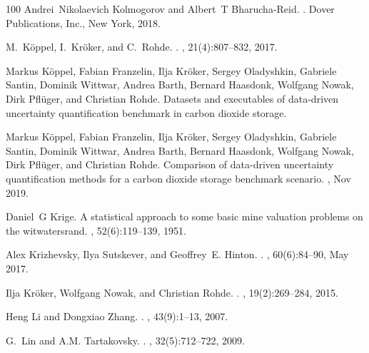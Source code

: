 \documentclass[a4paper,fleqn]{article}
\begin{document}
\begin{thebibliography}{100}
Andrei~Nikolaevich Kolmogorov and Albert~T Bharucha-Reid.
.
\newblock Dover Publications, Inc., New York, 2018.

M.~K{\"o}ppel, I.~Kr{\"o}ker, and C.~Rohde.
.
, 21(4):807--832, 2017.

Markus K{\"o}ppel, Fabian Franzelin, Ilja Kr{\"o}ker, Sergey Oladyshkin,
  Gabriele Santin, Dominik Wittwar, Andrea Barth, Bernard Haasdonk, Wolfgang
  Nowak, Dirk Pfl{\"u}ger, and Christian Rohde.
\newblock Datasets and executables of data-driven uncertainty quantification
  benchmark in carbon dioxide storage.

Markus K{\"o}ppel, Fabian Franzelin, Ilja Kr{\"o}ker, Sergey Oladyshkin,
  Gabriele Santin, Dominik Wittwar, Andrea Barth, Bernard Haasdonk, Wolfgang
  Nowak, Dirk Pfl{\"u}ger, and Christian Rohde.
\newblock Comparison of data-driven uncertainty quantification methods for a
  carbon dioxide storage benchmark scenario.
, Nov 2019.

Daniel~G Krige.
\newblock A statistical approach to some basic mine valuation problems on the
  witwatersrand.
, 52(6):119--139, 1951.

Alex Krizhevsky, Ilya Sutskever, and Geoffrey~E. Hinton.
.
, 60(6):84–90, May 2017.

Ilja Kr{\"o}ker, Wolfgang Nowak, and Christian Rohde.
.
, 19(2):269--284, 2015.

Heng Li and Dongxiao Zhang.
.
, 43(9):1--13, 2007.

G.~Lin and A.M. Tartakovsky.
.
, 32(5):712--722, 2009.


\end{thebibliography}
\end{document}
